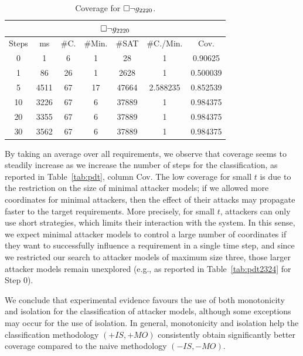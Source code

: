 \begin{table}[!t]
	\centering
\caption{Coverage for ${{\square}} \lnot g_{2220}$.}
{
\begin{tabular}{|c|c|c|c|c|c|c|}
\hline
\multicolumn{7}{|c|}{${{\square}} \lnot g_{2220}$} \\
\hline
Steps & ms &  \#C. & \#Min. & \#SAT & \#C./Min. & Cov.\\
\hline
0 & 1 & 6 & 1 & 28 & 1 & 0.90625\\
1 & 86 & 26 & 1 & 2628 & 1 & 0.500039\\
5 & 4511 & 67 & 17 & 47664 & 2.588235 & 0.852539\\
10 & 3226 & 67 & 6 & 37889 & 1 & 0.984375\\
20 & 3355 & 67 & 6 & 37889 & 1 & 0.984375\\
30 & 3562 & 67 & 6 & 37889 & 1 & 0.984375\\
 \hline
\end{tabular}
}
\label{tab:pdt2367}
\end{table}


By taking an average over all requirements, we observe that coverage seems to steadily increase as we increase the number of steps for the classification, as reported in Table~\ref{tab:pdt}, column Cov. The low coverage for small $t$ is due to the restriction on the size of minimal attacker models; if we allowed more coordinates for minimal attackers, then the effect of their attacks may propagate faster to the target requirements. More precisely, for small $t$, attackers can only use short strategies, which limits their interaction with the system. In this sense, we expect minimal attacker models to control a large number of coordinates if they want to successfully influence a requirement in a single time step, and since we restricted our search to attacker models of maximum size three, those larger attacker models remain unexplored (e.g., as reported in Table~\ref{tab:pdt2324} for Step 0).

We conclude that experimental evidence favours the use of both monotonicity and isolation for the classification of attacker models, although some exceptions may occur for the use of isolation. In general, monotonicity and isolation help the classification methodology $(+IS,+MO)$ consistently obtain significantly better coverage compared to the naive methodology $(-IS,-MO)$.

